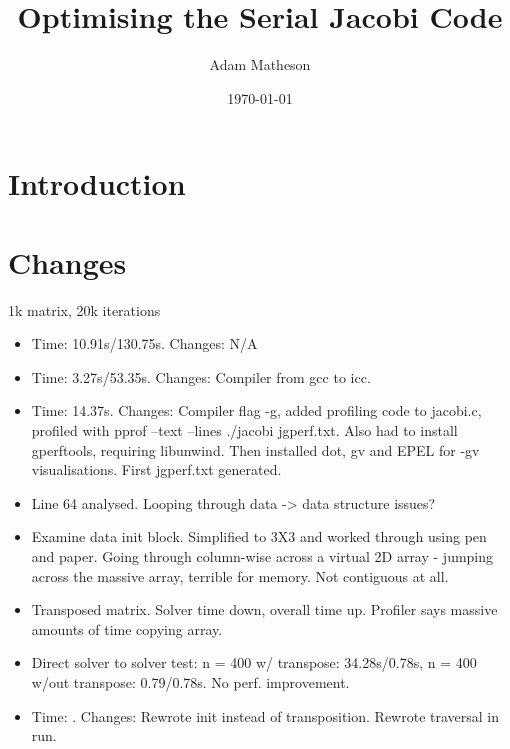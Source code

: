 \documentclass{article}
\begin{document}
\title{Optimising the Serial Jacobi Code}
\author{Adam Matheson}
\date{\today}

\section{Introduction}

\section{Changes}
1k matrix, 20k iterations
\begin{itemize}
\item Time: 10.91s/130.75s. Changes: N/A
\item Time: 3.27s/53.35s. Changes: Compiler from gcc to icc.
\item Time: 14.37s. Changes: Compiler flag -g, added profiling code to jacobi.c, profiled with pprof --text --lines ./jacobi jgperf.txt. Also had to install gperftools, requiring libunwind. Then installed dot, gv and EPEL for -gv visualisations. First jgperf.txt generated.
\item Line 64 analysed. Looping through data -> data structure issues?
\item Examine data init block. Simplified to 3X3 and worked through using pen and paper. Going through column-wise across a virtual 2D array - jumping across the massive array, terrible for memory. Not contiguous at all.
\item Transposed matrix. Solver time down, overall time up. Profiler says massive amounts of time copying array.
\item Direct solver to solver test: n = 400 w/ transpose: 34.28s/0.78s, n = 400 w/out transpose: 0.79/0.78s. No perf. improvement.
\item Time: . Changes: Rewrote init instead of transposition. Rewrote traversal in run.

\end{itemize}
\end{document}
